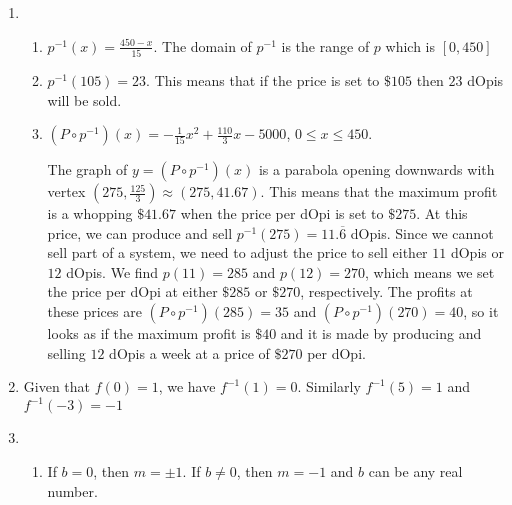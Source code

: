 \enlargethispage{1in}

\begin{enumerate}
\setcounter{enumi}{\value{HW}}


\item  

\begin{enumerate}

\item $p^{-1}(x) = \frac{450-x}{15}$.  The domain of $p^{-1}$ is the range of $p$ which is $[0,450]$

\item  $p^{-1}(105) = 23$. This means that if the price is set to $\$105$ then $23$ dOpis will be sold.

\item $\left(P\circ p^{-1}\right)(x) = -\frac{1}{15} x^2 + \frac{110}{3} x - 5000$, $0 \leq x \leq 450$.  

\smallskip

The graph of $y = \left(P\circ p^{-1}\right)(x)$ is a parabola opening downwards with vertex $\left(275, \frac{125}{3}\right) \approx (275, 41.67)$.  This means that the maximum profit is a whopping $\$41.67$ when the price per dOpi is set to $\$275$.   At this price, we can produce and sell $p^{-1}(275) = 11.\overline{6}$ dOpis.  Since we cannot sell part of a system, we need to adjust the price to sell either $11$ dOpis or $12$ dOpis. We find $p(11) = 285$ and $p(12) = 270$, which means we set the price per dOpi at either $\$285$ or $\$270$, respectively.  The profits at these prices are $\left(P\circ p^{-1}\right)(285) = 35$ and  $\left(P\circ p^{-1}\right)(270) = 40$, so it looks as if the maximum profit is $\$40$ and it is made by producing and selling $12$ dOpis a week at a price of $\$270$ per dOpi.

\end{enumerate}

\addtocounter{enumi}{1}

\item Given that $f(0) = 1$, we have $f^{-1}(1) = 0$.  Similarly $f^{-1}(5) = 1$ and $f^{-1}(-3) = -1$

\addtocounter{enumi}{9}

\item  \begin{enumerate} \addtocounter{enumii}{1} \item If $b =0$, then $m = \pm 1$.  If $b \neq 0$, then $m = -1$ and $b$ can be any real number. \end{enumerate}

\end{enumerate}

\newpage

